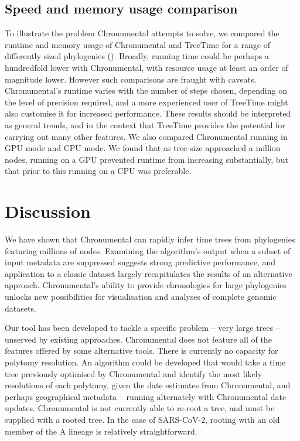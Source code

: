 \subsection*{Speed and memory usage comparison}
To illustrate the problem Chronumental attempts to solve, we compared the runtime and memory usage of Chronumental and TreeTime for a range of differently sized phylogenies (). Broadly, running time could be perhaps a hundredfold lower with Chronumental, with resource usage at least an order of magnitude lower. However such comparisons are fraught with caveats. Chronumental's runtime varies with the number of steps chosen, depending on the level of precision required, and a more experienced user of TreeTime might also customise it for increased performance. These results should be interpreted as general trends, and in the context that TreeTime provides the potential for carrying out many other features. We also compared Chronumental running in GPU mode and CPU mode. We found that as tree size approached a million nodes, running on a GPU prevented runtime from increasing substantially, but that prior to this running on a CPU was preferable.




\section*{Discussion}

We have shown that Chronumental can rapidly infer time trees from phylogenies featuring millions of nodes. Examining the algorithm's output when a subset of input metadata are suppressed suggests strong predictive performance, and application to a classic dataset largely recapitulates the results of an alternative approach. Chronumental's ability to provide chronologies for large phylogenies unlocks new possibilities for visualisation and analyses of complete genomic datasets.

Our tool has been developed to tackle a specific problem -- very large trees -- unserved by existing approaches. Chronumental does not feature all of the features offered by some alternative tools. There is currently no capacity for polytomy resolution. An algorithm could be developed that would take a time tree previously optimised by Chronumental and identify the most likely resolutions of each polytomy, given the date estimates from Chronumental, and perhaps geographical metadata -- running alternately with Chronumental date updates.  Chronumental is not currently able to re-root a tree, and must be supplied with a rooted tree. In the case of SARS-CoV-2, rooting with an old member of the A lineage is relatively straightforward.

